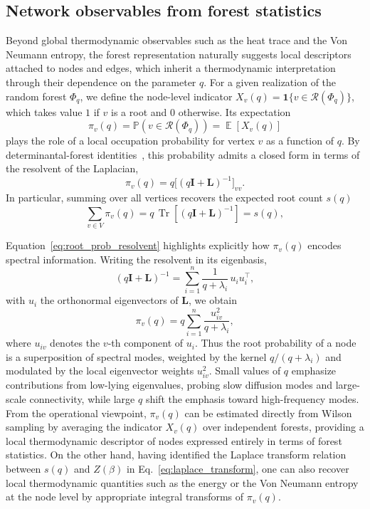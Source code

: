 \documentclass[10pt,aps,pre,twocolumn,nofootinbib,superscriptaddress,longbibliography]{revtex4-2}
\newcommand{\bE}[1]{\operatorname{\mathbb{E}}\left\lbrack #1\right\rbrack}
\newcommand{\bI}{\mathbf{I}}
\newcommand{\bL}{\mathbf{L}}
\newcommand{\Tr}[1]{\operatorname{Tr}\left\lbrack #1\right\rbrack}
\begin{document}
\subsection{Network observables from forest statistics}
Beyond global thermodynamic observables such as the heat trace and the Von Neumann entropy, the forest representation naturally suggests local descriptors attached to nodes and edges, which inherit a thermodynamic interpretation through their dependence on the parameter $q$. 
For a given realization of the random forest $\Phi_q$, we define the node-level indicator $X_v(q)=\mathbf{1}\{v\in\mathcal{R}(\Phi_q)\}$, which takes value $1$ if $v$ is a root and $0$ otherwise. 
Its expectation
\begin{equation}
\pi_v(q) = \mathbb{P}\left( v \in \mathcal{R}(\Phi_q) \right) = \bE{X_v(q)}
\end{equation}
plays the role of a local occupation probability for vertex $v$ as a function of $q$. 
By determinantal-forest identities~\cite{lyons2017probability,avena2018}, this probability admits a closed form in terms of the resolvent of the Laplacian,
\begin{equation}\label{eq:root_prob_resolvent}
  \pi_v(q) = q\lbrack (q\bI + \bL)^{-1}\rbrack_{vv}.
\end{equation}
In particular, summing over all vertices recovers the expected root count $s(q)$
\begin{equation}
  \sum_{v\in V} \pi_v(q) = q\,\Tr{(q\bI+\bL)^{-1}} = s(q),
\end{equation}

Equation~\ref{eq:root_prob_resolvent} highlights explicitly how $\pi_v(q)$ encodes spectral information.
Writing the resolvent in its eigenbasis,
\begin{equation}
  (q\bI+\bL)^{-1} = \sum_{i=1}^n \frac{1}{q+\lambda_i}\,u_i u_i^\top,
\end{equation}
with $u_i$ the orthonormal eigenvectors of $\bL$, we obtain
\begin{equation}\label{eq:root_prob_spectral}
  \pi_v(q) = q\sum_{i=1}^n \frac{u_{iv}^2}{q+\lambda_i},
\end{equation}
where $u_{iv}$ denotes the $v$-th component of $u_i$.
Thus the root probability of a node is a superposition of spectral modes, weighted by the kernel $q/(q+\lambda_i)$ and modulated by the local eigenvector weights $u_{iv}^2$. 
Small values of $q$ emphasize contributions from low-lying eigenvalues, probing slow diffusion modes and large-scale connectivity, while large $q$ shift the emphasis toward high-frequency modes. 
From the operational viewpoint, $\pi_v(q)$ can be estimated directly from Wilson sampling by averaging the indicator $X_v(q)$ over independent forests, providing a local thermodynamic descriptor of nodes expressed entirely in terms of forest statistics.
On the other hand, having identified the Laplace transform relation between $s(q)$ and $Z(\beta)$ in Eq.~\ref{eq:laplace_transform}, one can also recover local thermodynamic quantities such as the energy or the Von Neumann entropy at the node level by appropriate integral transforms of $\pi_v(q)$.
\end{document}
